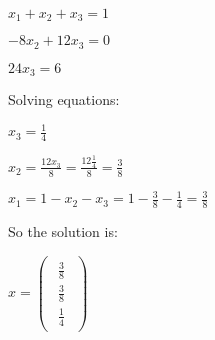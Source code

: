 \singlespacing

$x_1 + x_2 + x_3 = 1$

\singlespacing

$-8x_2 + 12x_3 = 0$

\singlespacing

$24x_3 = 6$

\singlespacing

Solving equations:

\singlespacing

$x_3 = \frac{1}{4}$

\singlespacing

$x_2 = \frac{12x_3}{8} = \frac{12\frac{1}{4}}{8} = \frac{3}{8}$

\singlespacing

$x_1 = 1 - x_2 - x_3 = 1 - \frac{3}{8} - \frac{1}{4} = \frac{3}{8}$

\singlespacing

So the solution is:

\singlespacing

{
    \renewcommand{\arraystretch}{1.5}
    \begin{math}
        x = \begin{pmatrix}
            \begin{array}{c}
                \frac{3}{8} \\
                \frac{3}{8} \\
                \frac{1}{4}
            \end{array}
        \end{pmatrix}\quad
        \begin{array}{c}
        \end{array}
    \end{math}
}
